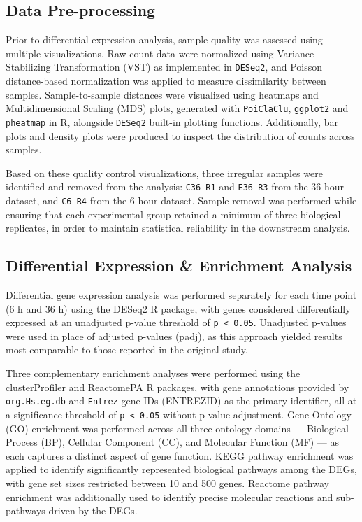 \subsection{Data Pre-processing}\label{data-pre-processing}

Prior to differential expression analysis, sample quality was assessed
using multiple visualizations. Raw count data were normalized using
Variance Stabilizing Transformation (VST) as implemented in
\texttt{DESeq2}, and Poisson distance-based normalization was applied to
measure dissimilarity between samples. Sample-to-sample distances were
visualized using heatmaps and Multidimensional Scaling (MDS) plots,
generated with \texttt{PoiClaClu}, \texttt{ggplot2} and
\texttt{pheatmap} in R, alongside \texttt{DESeq2} built-in plotting
functions. Additionally, bar plots and density plots were produced to
inspect the distribution of counts across samples.

Based on these quality control visualizations, three irregular samples
were identified and removed from the analysis: \texttt{C36-R1} and
\texttt{E36-R3} from the 36-hour dataset, and \texttt{C6-R4} from the
6-hour dataset. Sample removal was performed while ensuring that each
experimental group retained a minimum of three biological replicates, in
order to maintain statistical reliability in the downstream analysis.

\subsection{Differential Expression \& Enrichment
Analysis}\label{differential-expression-enrichment-analysis}

Differential gene expression analysis was performed separately for each
time point (6 h and 36 h) using the DESeq2 R package, with genes
considered differentially expressed at an unadjusted p-value threshold
of \texttt{p\ \textless{}\ 0.05}. Unadjusted p-values were used in place
of adjusted p-values (padj), as this approach yielded results most
comparable to those reported in the original study.

Three complementary enrichment analyses were performed using the
clusterProfiler and ReactomePA R packages, with gene annotations
provided by \texttt{org.Hs.eg.db} and \texttt{Entrez} gene IDs
(ENTREZID) as the primary identifier, all at a significance threshold of
\texttt{p\ \textless{}\ 0.05} without p-value adjustment. Gene Ontology
(GO) enrichment was performed across all three ontology domains ---
Biological Process (BP), Cellular Component (CC), and Molecular Function
(MF) --- as each captures a distinct aspect of gene function. KEGG
pathway enrichment was applied to identify significantly represented
biological pathways among the DEGs, with gene set sizes restricted
between 10 and 500 genes. Reactome pathway enrichment was additionally
used to identify precise molecular reactions and sub-pathways driven by
the DEGs.

